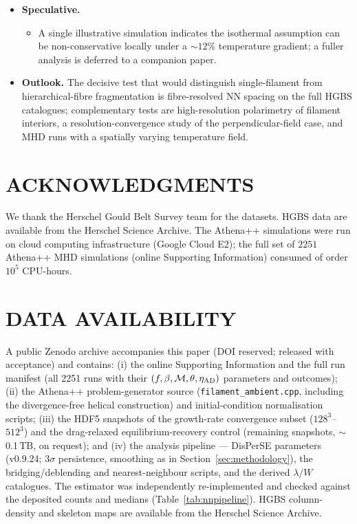 \documentclass[usenatbib,twoside,twocolumn]{mnras}
\begin{document}
\begin{itemize}
    \item \textbf{Speculative.}
    \begin{itemize}
        \item A single illustrative simulation indicates the isothermal assumption can be non-conservative locally under a $\sim12\%$ temperature gradient; a fuller analysis is deferred to a companion paper.
    \end{itemize}

    \item \textbf{Outlook.} The decisive test that would distinguish single-filament from hierarchical-fibre fragmentation is fibre-resolved NN spacing on the full HGBS catalogues; complementary tests are high-resolution polarimetry of filament interiors, a resolution-convergence study of the perpendicular-field case, and MHD runs with a spatially varying temperature field.
    \end{itemize}

\section*{ACKNOWLEDGMENTS}

We thank the Herschel Gould Belt Survey team for the datasets. HGBS data are available from the Herschel Science Archive. The Athena++ simulations were run on cloud computing infrastructure (Google Cloud E2); the full set of $2251$ Athena++ MHD simulations (online Supporting Information) consumed of order $10^5$ CPU-hours.

\section*{DATA AVAILABILITY}

A public Zenodo archive accompanies this paper (DOI reserved; released with acceptance) and contains: (i) the online Supporting Information and the full run manifest (all 2251 runs with their $(f,\beta,\mathcal{M},\theta,\eta_{\rm AD})$ parameters and outcomes); (ii) the Athena++ problem-generator source (\texttt{filament\_ambient.cpp}, including the divergence-free helical construction) and initial-condition normalisation scripts; (iii) the HDF5 snapshots of the growth-rate convergence subset ($128^3$--$512^3$) and the drag-relaxed equilibrium-recovery control (remaining snapshots, $\sim$0.1\,TB, on request); and (iv) the analysis pipeline --- DisPerSE parameters (v0.9.24; $3\sigma$ persistence, smoothing as in Section~\ref{sec:methodology}), the bridging/deblending and nearest-neighbour scripts, and the derived $\lambda/W$ catalogues. The estimator was independently re-implemented and checked against the deposited counts and medians (Table~\ref{tab:nnpipeline}). HGBS column-density and skeleton maps are available from the Herschel Science Archive.
\end{document}
